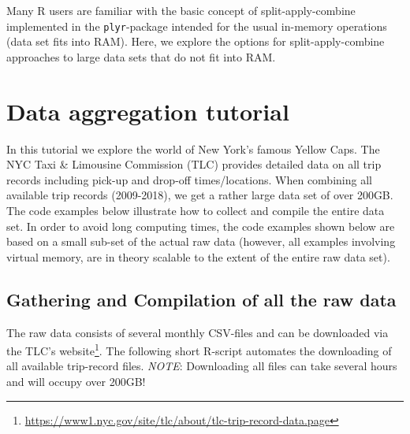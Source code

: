 \documentclass[
  12pt,
]{style/krantz}
\renewcommand{\href}[2]{#2\footnote{\url{#1}}}
\begin{document}
Many R users are familiar with the basic concept of split-apply-combine implemented in the \texttt{plyr}-package intended for the usual in-memory operations (data set fits into RAM). Here, we explore the options for split-apply-combine approaches to large data sets that do not fit into RAM.

\hypertarget{data-aggregation-tutorial}{%
\section{Data aggregation tutorial}\label{data-aggregation-tutorial}}

In this tutorial we explore the world of New York's famous Yellow Caps. The NYC Taxi \& Limousine Commission (TLC) provides detailed data on all trip records including pick-up and drop-off times/locations. When combining all available trip records (2009-2018), we get a rather large data set of over 200GB. The code examples below illustrate how to collect and compile the entire data set. In order to avoid long computing times, the code examples shown below are based on a small sub-set of the actual raw data (however, all examples involving virtual memory, are in theory scalable to the extent of the entire raw data set).

\hypertarget{gathering-and-compilation-of-all-the-raw-data}{%
\subsection{Gathering and Compilation of all the raw data}\label{gathering-and-compilation-of-all-the-raw-data}}

The raw data consists of several monthly CSV-files and can be downloaded via the \href{https://www1.nyc.gov/site/tlc/about/tlc-trip-record-data.page}{TLC's website}. The following short R-script automates the downloading of all available trip-record files. \emph{NOTE}: Downloading all files can take several hours and will occupy over 200GB!
\end{document}
